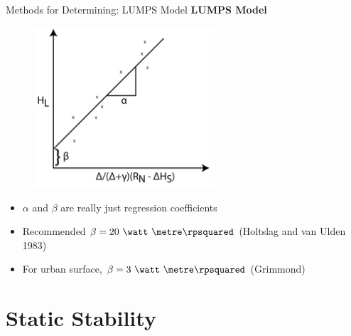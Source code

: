 \begin{frame}{Methods for Determining: LUMPS Model}
\textbf{LUMPS Model}\\
\begin{figure}
	\includegraphics[width=0.6\textwidth]{fig8}
\end{figure}
\begin{itemize}
	\item $\alpha$ and $\beta$ are really just regression coefficients
	\item Recommended $\beta=20\ \watt\ \metre\rpsquared$ (Holtslag and van Ulden 1983)
	\item For urban surface, $\beta=3\ \watt\ \metre\rpsquared$ (Grimmond)
\end{itemize}

\end{frame}
\section{Static Stability} %
